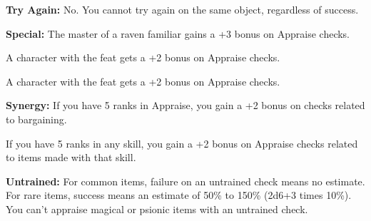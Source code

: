 \textbf{Try Again:} No. You cannot try again on the same object, regardless of success.

\textbf{Special:} The master of a raven familiar gains a +3 bonus on Appraise checks.

A character with the  feat gets a +2 bonus on Appraise checks.

A character with the  feat gets a +2 bonus on Appraise checks.

\textbf{Synergy:} If you have 5 ranks in Appraise, you gain a +2 bonus on  checks related to bargaining.

If you have 5 ranks in any  skill, you gain a +2 bonus on Appraise checks related to items made with that  skill.

\textbf{Untrained:} For common items, failure on an untrained check means no estimate. For rare items, success means an estimate of 50\% to 150\% (2d6+3 times 10\%). You can't appraise magical or psionic items with an untrained check.